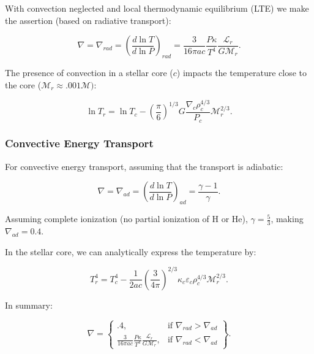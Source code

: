 \documentclass[twocolumn]{aastex631}
\begin{document}
With convection neglected and local thermodynamic equilibrium (LTE) we make the assertion (based on radiative transport):

\begin{equation}
	\nabla = \nabla_{rad} = \left(\frac{d \ln{T}}{d \ln{P}}\right)_{rad} = \frac{3}{16\pi ac}\frac{P \kappa}{T^4}\frac{\mathcal{L}_r}{G\mathcal{M}_r}.
\end{equation}

\noindent The presence of convection in a stellar core ($c$) impacts the temperature close to the core ($\mathcal{M}_r \approx .001\mathcal{M})$:

\begin{equation}
 	\ln{T_r} = \ln{T_c} - \left(\frac{\pi}{6}\right)^{1/3} G \frac{\nabla_c \rho_c^{4/3}}{P_c} \mathcal{M}_r^{2/3}.
\end{equation}

\subsubsection{Convective Energy Transport}

For convective energy transport, assuming that the transport is adiabatic:

\begin{equation}
	\nabla = \nabla_{ad} = \left(\frac{d \ln{T}}{d \ln{P}}\right)_{ad} = \frac{\gamma - 1}{\gamma}.
\end{equation}

\noindent Assuming complete ionization (no partial ionization of H or He), $\gamma = \frac{5}{3}$, making $ \nabla_{ad} = 0.4$.

In the stellar core, we can analytically express the temperature by:

\begin{equation}
	T_r^4 = T_c^4 - \frac{1}{2ac}\left(\frac{3}{4\pi}\right)^{2/3} \kappa_c \varepsilon_c \rho_c^{4/3} \mathcal{M}_r^{2/3}.
\end{equation}

In summary:

\begin{equation}
\nabla = 
\left\{
    \begin{array}{rc}
        .4, & \text{if } \nabla_{rad} > \nabla_{ad}\\
        \frac{3}{16\pi ac}\frac{P \kappa}{T^4}\frac{\mathcal{L}_r}{G\mathcal{M}_r}, & \text{if } \nabla_{rad} < \nabla_{ad}
    \end{array}
\right\}.
\end{equation}
\end{document}
